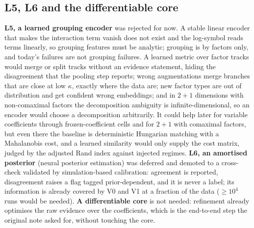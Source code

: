 \subsection{L5, L6 and the differentiable core}
\textbf{L5, a learned grouping encoder} was rejected for now. A stable linear encoder that makes the interaction term vanish does not exist and the log-symbol reads terms linearly, so grouping features must be analytic; grouping is by factors only, and today's failures are not grouping failures.
A learned metric over factor tracks would merge or split tracks without an evidence statement, hiding the disagreement that the pooling step reports; wrong augmentations merge branches that are close at low $\kappa$, exactly where the data are; new factor types are out of distribution and get confident wrong embeddings;
and in $2{+}1$ dimensions with non-comaximal factors the decomposition ambiguity is infinite-dimensional, so an encoder would choose a decomposition arbitrarily. It could help later for variable coefficients through frozen-coefficient cells and for $2{+}1$ with comaximal factors, but even there the baseline is deterministic Hungarian matching with a Mahalanobis cost, and a learned similarity would only supply the cost matrix, judged by the adjusted Rand index against injected regimes.
\textbf{L6, an amortised posterior} (neural posterior estimation) was deferred and demoted to a cross-check validated by simulation-based calibration: agreement is reported, disagreement raises a flag tagged prior-dependent, and it is never a label; its information is already covered by V0 and V1 at a fraction of the data ($\ge10^4$ runs would be needed).
\textbf{A differentiable core} is not needed: refinement already optimises the raw evidence over the coefficients, which is the end-to-end step the original note asked for, without touching the core.

